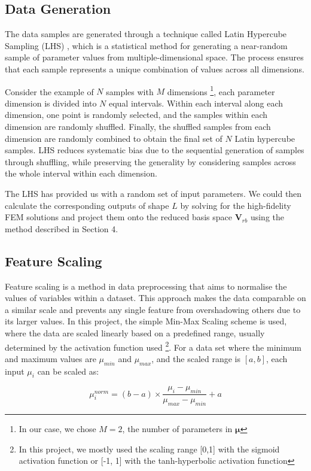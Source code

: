\subsection{Data Generation}
The data samples are generated through a technique called Latin Hypercube Sampling (LHS) \cite{saves2024smt}, which is a statistical method for generating a near-random sample of parameter values from multiple-dimensional space. The process ensures that each sample represents a unique combination of values across all dimensions. 

Consider the example of $N$ samples with $M$ dimensions \footnote{In our case, we chose $M=2$, the number of parameters in $\mathbf{\mu}$}, each parameter dimension is divided into $N$ equal intervals. Within each interval along each dimension, one point is randomly selected, and the samples within each dimension are randomly shuffled. Finally, the shuffled samples from each dimension are randomly combined to obtain the final set of $N$ Latin hypercube samples. LHS reduces systematic bias due to the sequential generation of samples through shuffling, while preserving the generality by considering samples across the whole interval within each dimension. 

The LHS has provided us with a random set of input parameters. We could then calculate the corresponding outputs of shape $L$ by solving for the high-fidelity FEM solutions and project them onto the reduced basis space $\mathbf{V}_{rb}$ using the method described in Section 4. 

\subsection{Feature Scaling}
Feature scaling is a method in data preprocessing that aims to normalise the values of variables within a dataset. This approach makes the data comparable on a similar scale and prevents any single feature from overshadowing others due to its larger values. In this project, the simple Min-Max Scaling scheme is used, where the data are scaled linearly based on a predefined range, usually determined by the activation function used \footnote{In this project, we mostly used the scaling range [0,1] with the sigmoid activation function or [-1, 1] with the tanh-hyperbolic activation function}. For a data set where the minimum and maximum values are $\mu_{min}$ and $\mu_{max}$, and the scaled range is $[a, b]$, each input $\mu_i$ can be scaled as:

\begin{equation}
    \mu^{norm}_i = \left( b - a \right) \times \frac{\mu_i - \mu_{min}}{\mu_{max} - \mu_{min}} + a
    \label{eqn:data_scaling}
\end{equation}

